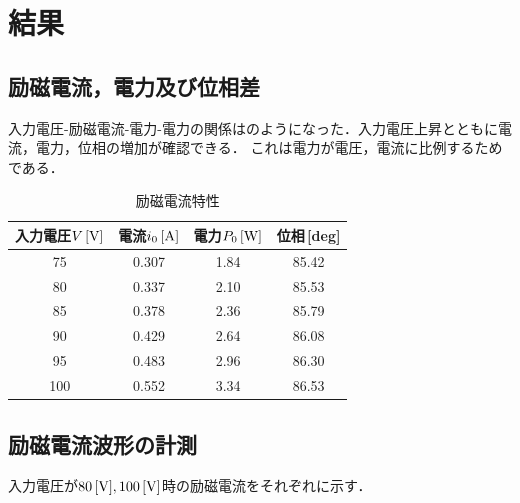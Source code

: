 \clearpage

\section{結果}
\subsection{励磁電流，電力及び位相差}
入力電圧-励磁電流-電力-電力の関係はのようになった．入力電圧上昇とともに電流，電力，位相の増加が確認できる．
	これは電力が電圧，電流に比例するためである．
	\begin{table}[h]
	\centering
	\caption{励磁電流特性}
	\label{tab:re1}
	\begin{tabular}{cccc}
	\hline
	入力電圧$V\,[\rm{V}]$& 電流$i_{0}\,[\rm{A}]$& 電力$P_{0}\,[\rm{W}]$& 位相\,[\rm{deg}]  \\ 
	\hline
	75  & 0.307    & 1.84     & 85.42 \\
	80  & 0.337    & 2.10      & 85.53 \\
	85  & 0.378    & 2.36     & 85.79 \\
	90  & 0.429    & 2.64     & 86.08 \\
	95  & 0.483    & 2.96     & 86.30 \\
	100 & 0.552    & 3.34     & 86.53 \\ \hline
	\end{tabular}
	\end{table}
	
\subsection{励磁電流波形の計測}
入力電圧が$80\,[\rm{V}], 100\,[\rm{V}]$時の励磁電流をそれぞれに示す．

